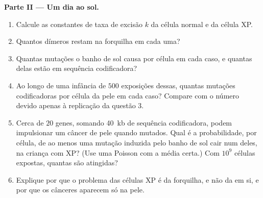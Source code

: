 \begin{problem}
\medskip
\noindent\textbf{Parte II --- Um dia ao sol.}
\begin{enumerate}[resume]
  \item Calcule as constantes de taxa de excisão $k$ da célula normal
        e da célula XP.
  \item Quantos dímeros restam na forquilha em cada uma?
  \item Quantas mutações o banho de sol causa por célula em cada caso,
        e quantas delas estão em sequência codificadora?
  \item Ao longo de uma infância de $500$ exposições dessas, quantas
        mutações codificadoras por célula da pele em cada caso?
        Compare com o número devido apenas à replicação da questão 3.
  \item Cerca de $20$ genes, somando \qty{40}{kb} de sequência
        codificadora, podem impulsionar um câncer de pele quando
        mutados. Qual é a probabilidade, por célula, de ao menos uma
        mutação induzida pelo banho de sol cair num deles, na criança
        com XP? (Use uma Poisson com a média certa.) Com $10^{9}$
        células expostas, quantas são atingidas?
  \item Explique por que o problema das células XP é da forquilha, e
        não da  em si, e por que os cânceres aparecem só na pele.
\end{enumerate}


\end{problem}
